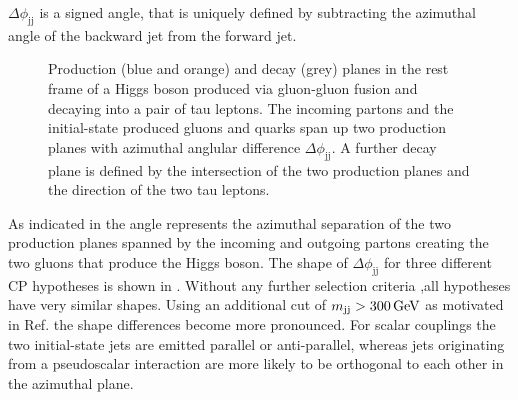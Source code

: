  $\Delta\phi_\text{jj}$ is a signed angle, that is uniquely defined by subtracting the azimuthal angle of the backward jet from the forward jet.
 \begin{figure}[h]
     \centering
     
     \caption[Event kinematics of $\mathsf{gg\rightarrow H+2j}$ events.]{Production (blue and orange) and decay (grey) planes in the rest frame of a Higgs boson produced via gluon-gluon fusion and decaying into a pair of tau leptons. The incoming partons 
     and the initial-state produced gluons and quarks span up two production planes with azimuthal anglular difference $\Delta\phi_\text{jj}$. A further decay plane
     is defined by the intersection of the two production planes and the direction of the two tau leptons.}\label{ES:event_kinematics}
 \end{figure}%
As indicated in  the angle represents the azimuthal separation of the two production planes spanned by the incoming and outgoing partons creating the two 
gluons that produce the Higgs boson. The shape of $\Delta\phi_\text{jj}$ for three different CP hypotheses is shown in .
Without any further selection criteria ,all hypotheses have very similar shapes. Using an additional cut of $m_\text{jj}>\text{300\,{GeV}}$ as motivated in Ref. \cite{harris_paper} the shape differences become more pronounced. For scalar couplings the two initial-state jets are emitted parallel or anti-parallel, whereas jets originating from a pseudoscalar interaction are more likely to be orthogonal to each other in the azimuthal plane. 
